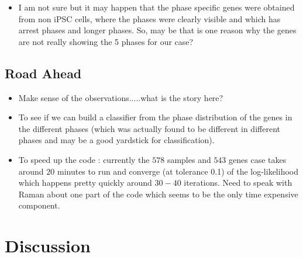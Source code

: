 \documentclass[11pt]{article}
\begin{document}
\begin{itemize}
\item I am not sure but it may happen that the phase specific genes were obtained from non iPSC cells, where the phases were clearly visible and which has arrest phases and longer phases. So, may be that is one reason why the genes are not really showing the 5 phases for our case?

\end{itemize}


\subsection{Road Ahead}

\begin{itemize}

\item Make sense of the observations.....what is the story here?



\item To see if we can build a classifier from the phase distribution of the genes in the different phases (which was actually found to be different in different phases and may be a good yardstick for classification).

\item To speed up the code : currently the $578$ samples and $543$ genes case takes around $20$ minutes to run and converge (at tolerance 0.1) of the log-likelihood which happens pretty quickly around $30-40$ iterations. Need to speak with Raman about one part of the code which seems to be the only time expensive component.
\end{itemize}




\section{Discussion}
\end{document}
